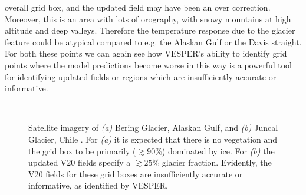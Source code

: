 \documentclass[twocolumn]{article}
\begin{document}
overall grid box, and the updated field may have been an over correction. Moreover, this is an area with lots of orography, with snowy mountains at high altitude and deep valleys. Therefore the temperature response due to the glacier feature could be atypical compared to e.g. the Alaskan Gulf or the Davis straight. For both these points we can again see how VESPER's ability to identify grid points where the model predictions become worse in this way is a powerful tool for identifying updated fields or regions which are insufficiently accurate or informative. \newline 
	\begin{figure}[h!]
		 \\
		\caption{Satellite imagery of \textit{(a)} Bering Glacier, Alaskan Gulf, and \textit{(b)} Juncal Glacier, Chile . For \textit{(a)} it is expected that there is no vegetation and the grid box to be primarily ($\gtrsim 90 \%$) dominated by ice. For \textit{(b)} the updated V20 fields specify a $\gtrsim 25 \%$  glacier fraction. Evidently, the V20 fields for these grid boxes are insufficiently accurate or informative, as identified by VESPER.} 
		\label{fig:glacier}
	\end{figure}
	
	
\end{document}
